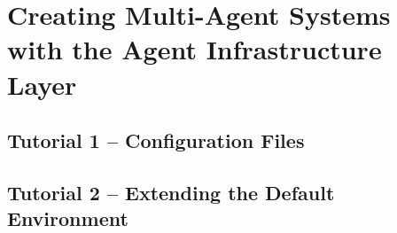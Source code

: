 %

\chapter{Creating Multi-Agent Systems with the Agent Infrastructure Layer}

\section{Tutorial 1 -- Configuration Files}

{
  \let\section\subsection
  \let\subsection\subsubsection
  \let\subsubsection\paragraph
  
  
  }

\section{Tutorial 2 -- Extending the Default Environment}

{
  \let\section\subsection
  \let\subsection\subsubsection
  \let\subsubsection\paragraph
  
  
  }


